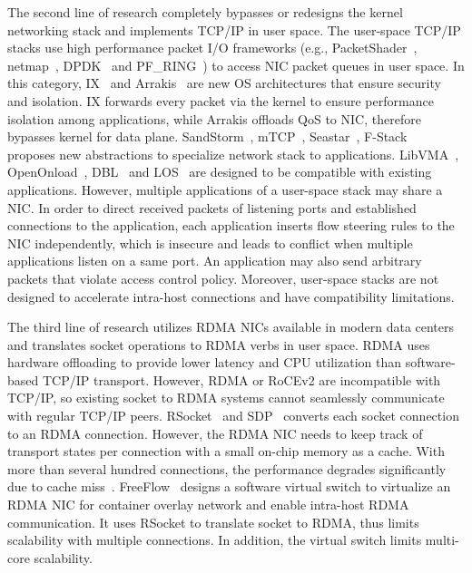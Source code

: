 The second line of research completely bypasses or redesigns the kernel networking stack and implements TCP/IP in user space.
The user-space TCP/IP stacks use high performance packet I/O frameworks (e.g., PacketShader~\cite{han2010packetshader}, netmap~\cite{rizzo2012netmap},  DPDK~\cite{dpdk} and PF\_RING~\cite{pf-ring}) to access NIC packet queues in user space.
In this category, IX~\cite{belay2017ix} and Arrakis~\cite{peter2016arrakis} are new OS architectures that ensure security and isolation.
IX forwards every packet via the kernel to ensure performance isolation among applications, while Arrakis offloads QoS to NIC, therefore bypasses kernel for data plane.
SandStorm~\cite{marinos2014network}, mTCP~\cite{jeong2014mtcp}, Seastar~\cite{seastar}, F-Stack~\cite{fstack} proposes new abstractions to specialize network stack to applications.
LibVMA~\cite{libvma}, OpenOnload~\cite{openonload}, DBL~\cite{dbl} and LOS~\cite{huang2017high} are designed to be compatible with existing applications.
However, multiple applications of a user-space stack may share a NIC.
In order to direct received packets of listening ports and established connections to the application, each application inserts flow steering rules to the NIC independently, which is insecure and leads to conflict when multiple applications listen on a same port.
An application may also send arbitrary packets that violate access control policy.
Moreover, user-space stacks are not designed to accelerate intra-host connections and have compatibility limitations.

The third line of research utilizes RDMA NICs available in modern data centers~\cite{guo2016rdma} and translates socket operations to RDMA verbs in user space.
RDMA uses hardware offloading to provide lower latency and CPU utilization than software-based TCP/IP transport.
However, RDMA or RoCEv2 are incompatible with TCP/IP, so existing socket to RDMA systems cannot seamlessly communicate with regular TCP/IP peers.
RSocket~\cite{rsockets} and SDP~\cite{socketsdirect} converts each socket connection to an RDMA connection.
However, the RDMA NIC needs to keep track of transport states per connection with a small on-chip memory as a cache.
With more than several hundred connections, the performance degrades significantly due to cache miss~\cite{mprdma,kaminsky2016design}.
FreeFlow~\cite{freeflow} designs a software virtual switch to virtualize an RDMA NIC for container overlay network and enable intra-host RDMA communication.
It uses RSocket to translate socket to RDMA, thus limits scalability with multiple connections.
In addition, the virtual switch limits multi-core scalability.

